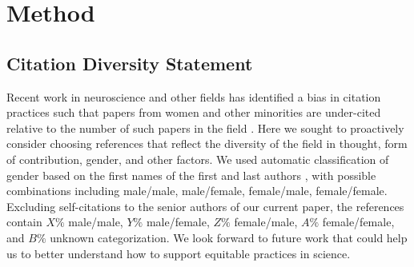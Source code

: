 \documentclass[12pt]{article}
\begin{document}
\section{Method}
\subsection{Citation Diversity Statement}

Recent work in neuroscience and other fields has identified a bias in citation practices such that papers from women and other minorities are under-cited relative to the number of such papers in the field \cite{Dworkin2020.01.03.894378, maliniak2013gender, caplar2017quantitative, chakravartty2018communicationsowhite, YannikThiemKrisF.SealeyAmyE.FerrerAdrielM.Trott2018, dion2018gendered}. Here we sought to proactively consider choosing references that reflect the diversity of the field in thought, form of contribution, gender, and other factors. We used automatic classification of gender based on the first names of the first and last authors \cite{Dworkin2020.01.03.894378}, with possible combinations including male/male, male/female, female/male, female/female. Excluding self-citations to the senior authors of our current paper, the references contain $X\%$ male/male, $Y\%$ male/female, $Z\%$ female/male, $A\%$ female/female, and $B\%$ unknown categorization. We look forward to future work that could help us to better understand how to support equitable practices in science.

\newpage


\end{document}
